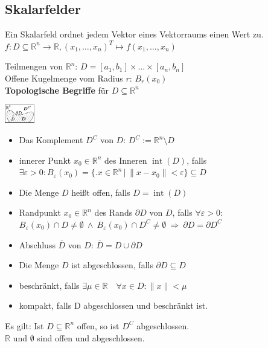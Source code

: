 \documentclass[6pt,a4paper]{scrartcl}
\newcommand{\iset}[2]{\ensuremath{\bigl\{ \bigl. #1 \, \bigr| \, #2 \bigr\}}}                   %
\newcommand{\norm}[1]{\ensuremath{\|#1\|}}                                                      %
\newcommand{\inn}{\operatorname{int}}
\renewcommand{\emph}[1]{\textbf{#1}}                                                            %
\newcommand{\ol}[1]{\ensuremath{\overline{#1}}}                                %
\newcommand{\R}{\ensuremath{\mathbb R}}
\begin{document}
\begin{multicols*}{4}
    \section{Skalarfelder}
    Ein Skalarfeld ordnet jedem Vektor eines Vektorraums einen Wert zu.\\
    $ f:D\subseteq \mathbb R^n \rightarrow \mathbb R, (x_1,\ldots ,x_n)^T \mapsto f(x_1,\ldots ,x_n) $
    \parbox{5.5cm}{
    Teilmengen von $\mathbb R^n$: $D = [a_1,b_1] \times ... \times [a_n,b_n]$\\
    Offene Kugelmenge vom Radius $r$: $B_r(x_0)$\\
    \emph{Topologische Begriffe} für $D \subseteq \mathbb R^n$ } \parbox{1.0cm}{ \includegraphics[height=0.8cm]{img/topologie.pdf} }
    \begin{itemize}\itemsep-1pt
        \item Das Komplement $D^C$ von $D$: $D^C := \R^n \setminus D$
        \item innerer Punkt $x_0 \in \mathbb R^n$ des Inneren $\inn(D)$, falls \\
              $\exists \varepsilon > 0: B_\varepsilon (x_0) = \iset{x\in \mathbb R^n}{\norm{x-x_0} < \varepsilon} \subseteq D$
        \item Die Menge $D$ heißt offen, falls $D=\inn(D)$
        \item Randpunkt $x_0 \in \mathbb R^n$ des Rands $\partial D$ von $D$, falls $\forall \varepsilon > 0:$ \\
              $B_\varepsilon(x_0) \cap D \ne \emptyset \ \land \ B_\varepsilon(x_0) \cap D^C \ne \emptyset \ \Rightarrow \ \partial D = \partial D^C$
        \item Abschluss $\ol D$ von $D$: $\overline{D}=D \cup \partial D$
        \item Die Menge $D$ ist abgeschlossen, falls $\partial D \subseteq D$
        \item beschränkt, falls $\exists \mu \in \mathbb R \quad \forall x \in D: \norm{x} < \mu$
        \item kompakt, falls D abgeschlossen und beschränkt ist.
    \end{itemize}
    Es gilt: Ist $D \subseteq \mathbb R^n$ offen, so ist $D^C$ abgeschlossen. \\
    $\mathbb R$ und $\emptyset$ sind offen und abgeschlossen.


\end{multicols*}
\end{document}
